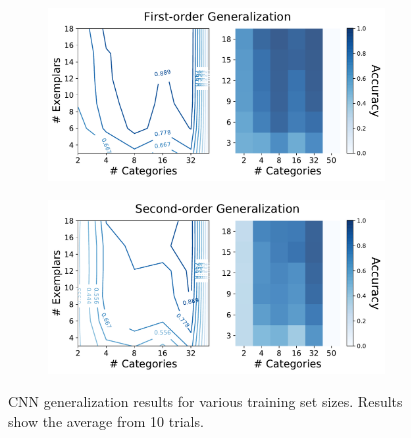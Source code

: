 \begin{figure}[h]
    \begin{center}
        \begin{subfigure}[b]{0.48\textwidth}
            \begin{center}
                \includegraphics[width=0.98\textwidth]
                {figures/cnn_o1_acc.pdf}
            \end{center}
        \end{subfigure}
        \begin{subfigure}[b]{0.48\textwidth}
            \begin{center}
                \includegraphics[width=0.98\textwidth]
                {figures/cnn_o2_acc.pdf}
            \end{center}
        \end{subfigure}
    \end{center}
    \caption{CNN generalization results for various training set sizes. Results
    show the average from 10 trials.}
    \label{fig:cnn_gen_results}
\end{figure}